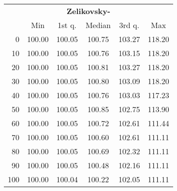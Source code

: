 \begin{tabular}{r|ccccc}
  \multicolumn{6}{c}{{\bf Zelikovsky-}} \\
  & Min & 1st q. & Median & 3rd q. & Max \\ \hline\hline
  0 & 100.00 & 100.05 & 100.75 & 103.27 & 118.20
\\ 10 & 100.00 & 100.05 & 100.76 & 103.15 & 118.20
\\ 20 & 100.00 & 100.05 & 100.81 & 103.27 & 118.20
\\ 30 & 100.00 & 100.05 & 100.80 & 103.09 & 118.20
\\ 40 & 100.00 & 100.05 & 100.76 & 103.03 & 117.23
\\ 50 & 100.00 & 100.05 & 100.85 & 102.75 & 113.90
\\ 60 & 100.00 & 100.05 & 100.72 & 102.61 & 111.44
\\ 70 & 100.00 & 100.05 & 100.60 & 102.61 & 111.11
\\ 80 & 100.00 & 100.05 & 100.69 & 102.32 & 111.11
\\ 90 & 100.00 & 100.05 & 100.48 & 102.16 & 111.11
\\ 100 & 100.00 & 100.04 & 100.22 & 102.05 & 111.11
\end{tabular}
